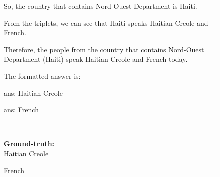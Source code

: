 \begin{figure}
\begin{tcolorbox}[colback=gray!5!white, colframe=gray!75!black, title=CWQ-WebQTest-100\_bf66fd89b6e9fc5fcb96c8b3f7a0e616]
So, the country that contains Nord-Ouest Department is Haiti.



From the triplets, we can see that Haiti speaks Haitian Creole and French.



Therefore, the people from the country that contains Nord-Ouest Department (Haiti) speak Haitian Creole and French today.



The formatted answer is:



ans: Haitian Creole

ans: French

\rule{\linewidth}{0.4pt}
\\
\textbf{Ground-truth:}\\
Haitian Creole

French

\end{tcolorbox}
\end{figure}



